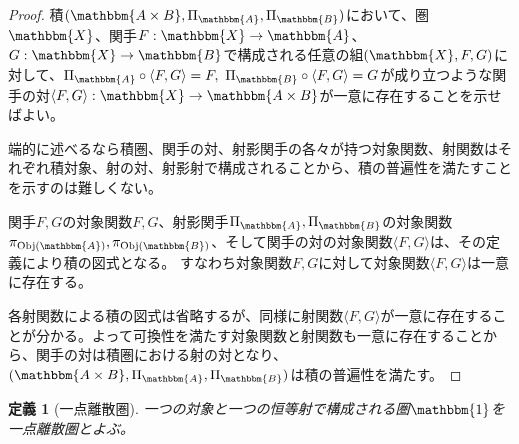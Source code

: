 \documentclass[uplatex,dvipdfmx]{jsarticle}
\newcommand{\cat}[1]{\mathbbm{#1}}
\newcommand{\arrow}{\rightarrow}
\newcommand{\functor}[3]{#1:\cat{#2}\arrow \cat{#3}}
\newcommand{\tuple}[1]{\langle #1\rangle}
\newcommand{\obj}[1]{\mathrm{Obj}(\cat{#1})}
\newtheorem{proof}{証明}[section]
\newtheorem{define}{定義}[section]
\numberwithin{proof}{subsection}
\numberwithin{prop}{subsection}
\numberwithin{define}{subsection}
\begin{document}
	\begin{proof}
		積$(\cat{A\times B},\Pi_\cat{A},\Pi_\cat{B})$において、圏$\cat{X}$、関手$\functor{F}{X}{A}$、$\functor{G}{X}{B}$で構成される任意の組$(\cat{X},F,G)$に対して、$\Pi_\cat{A}\circ\tuple{F,G}=F,\ \Pi_\cat{B}\circ\tuple{F,G}=G$が成り立つような関手の対$\functor{\tuple{F,G}}{X}{A\times B}$が一意に存在することを示せばよい。
		\begin{center}
		\end{center}
		端的に述べるなら積圏、関手の対、射影関手の各々が持つ対象関数、射関数はそれぞれ積対象、射の対、射影射で構成されることから、積の普遍性を満たすことを示すのは難しくない。

		関手$F,G$の対象関数$F,G$、射影関手$\Pi_\cat{A},\Pi_\cat{B}$の対象関数$\pi_{\obj{A}},\pi_{\obj{B}}$、そして関手の対の対象関数$\tuple{F,G}$は、その定義により積の図式となる。
		すなわち対象関数$F,G$に対して対象関数$\tuple{F,G}$は一意に存在する。
		\begin{center}
		\end{center}
		各射関数による積の図式は省略するが、同様に射関数$\tuple{F,G}$が一意に存在することが分かる。よって可換性を満たす対象関数と射関数も一意に存在することから、関手の対は積圏における射の対となり、$(\cat{A\times B},\Pi_\cat{A},\Pi_\cat{B})$は積の普遍性を満たす。
	\end{proof}
	\begin{define}[一点離散圏]
	一つの対象と一つの恒等射で構成される圏$\cat{1}$を一点離散圏とよぶ。
	\end{define}
\end{document}
